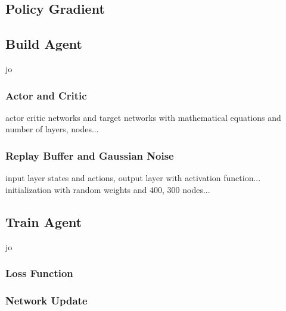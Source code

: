 \subsection{Policy Gradient}

\subsection{Build Agent}
jo
\subsubsection{Actor and Critic}
actor critic networks and target networks with mathematical equations
and number of layers, nodes... 
\subsubsection{Replay Buffer and Gaussian Noise}
input layer states and actions, output layer with activation function...
initialization with random weights and 400, 300 nodes...
\subsection{Train Agent}
jo
\subsubsection{Loss Function}
\subsubsection{Network Update}
